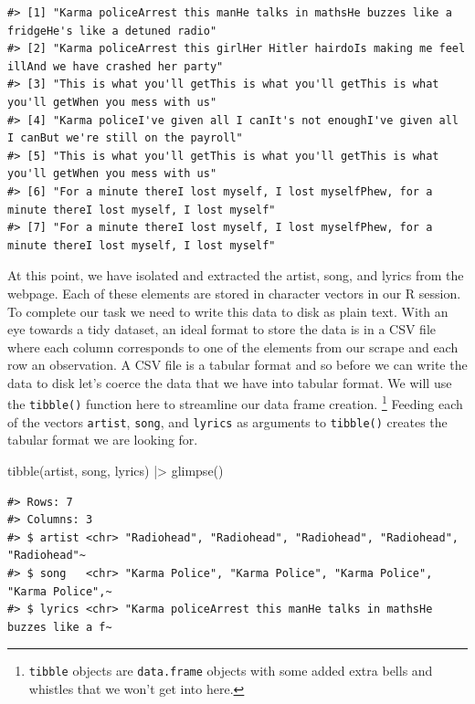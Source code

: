 \documentclass[
  letterpaper,
]{scrbook}
\newenvironment{Shaded}{\begin{snugshade}}{\end{snugshade}}
\newcommand{\FunctionTok}[1]{\textcolor[rgb]{0.00,0.00,0.00}{#1}}
\newcommand{\NormalTok}[1]{\textcolor[rgb]{0.00,0.00,0.00}{#1}}
\newcommand{\SpecialCharTok}[1]{\textcolor[rgb]{0.00,0.00,0.00}{#1}}
\begin{document}
\begin{verbatim}
#> [1] "Karma policeArrest this manHe talks in mathsHe buzzes like a fridgeHe's like a detuned radio"      
#> [2] "Karma policeArrest this girlHer Hitler hairdoIs making me feel illAnd we have crashed her party"   
#> [3] "This is what you'll getThis is what you'll getThis is what you'll getWhen you mess with us"        
#> [4] "Karma policeI've given all I canIt's not enoughI've given all I canBut we're still on the payroll" 
#> [5] "This is what you'll getThis is what you'll getThis is what you'll getWhen you mess with us"        
#> [6] "For a minute thereI lost myself, I lost myselfPhew, for a minute thereI lost myself, I lost myself"
#> [7] "For a minute thereI lost myself, I lost myselfPhew, for a minute thereI lost myself, I lost myself"
\end{verbatim}

At this point, we have isolated and extracted the artist, song, and
lyrics from the webpage. Each of these elements are stored in character
vectors in our R session. To complete our task we need to write this
data to disk as plain text. With an eye towards a tidy dataset, an ideal
format to store the data is in a CSV file where each column corresponds
to one of the elements from our scrape and each row an observation. A
CSV file is a tabular format and so before we can write the data to disk
let's coerce the data that we have into tabular format. We will use the
\texttt{tibble()} function here to streamline our data frame creation.
\footnote{\texttt{tibble} objects are \texttt{data.frame} objects with
  some added extra bells and whistles that we won't get into here.}
Feeding each of the vectors \texttt{artist}, \texttt{song}, and
\texttt{lyrics} as arguments to \texttt{tibble()} creates the tabular
format we are looking for.

\begin{Shaded}
\begin{Highlighting}[]
\FunctionTok{tibble}\NormalTok{(artist, song, lyrics) }\SpecialCharTok{|\textgreater{}} 
  \FunctionTok{glimpse}\NormalTok{()}
\end{Highlighting}
\end{Shaded}

\begin{verbatim}
#> Rows: 7
#> Columns: 3
#> $ artist <chr> "Radiohead", "Radiohead", "Radiohead", "Radiohead", "Radiohead"~
#> $ song   <chr> "Karma Police", "Karma Police", "Karma Police", "Karma Police",~
#> $ lyrics <chr> "Karma policeArrest this manHe talks in mathsHe buzzes like a f~
\end{verbatim}
\end{document}
